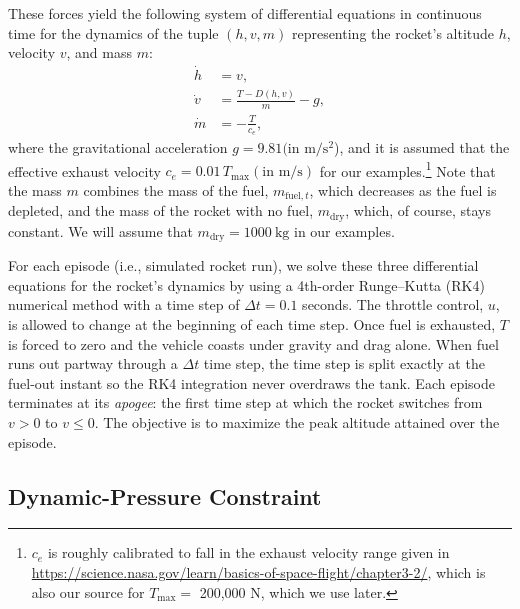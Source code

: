\documentclass[mnsc,sglanonrev]{informs4}
\begin{document}
These forces yield the following system of differential equations in continuous time for the dynamics of the tuple $(h,v,m)$ representing the rocket's altitude $h$, velocity $v$, and mass $m$:
\begin{align}
  \dot h &= v, \label{eq:hdot}\\
  \dot v &= \frac{T - D(h,v)}{m} - g, \label{eq:vdot}\\
  \dot m &= -\frac{T}{c_e}, \label{eq:mdot}
\end{align}
where the gravitational acceleration $g = 9.81 (\mbox{in } \mathrm{m/s^2}$), and it is assumed that the effective exhaust velocity $c_e = 0.01\, T_{\max} (\mbox{in } \mathrm{m/s})$ for our examples.\footnote{$c_e$ is roughly calibrated to fall in the exhaust velocity range given in \url{https://science.nasa.gov/learn/basics-of-space-flight/chapter3-2/}, which is also our source for  $T_\mathrm{max} =$ 200,000 N, which we use later.} Note that the mass $m$ combines the mass of the fuel, $m_{\textrm{fuel},t}$, which decreases as the fuel is depleted, and the mass of the rocket with no fuel, $m_{\mathrm{dry}}$, which, of course, stays constant. We will assume that $m_{\mathrm{dry}} = 1000\ \mathrm{kg}$ in our examples.

For each episode (i.e., simulated rocket run), we solve these three differential equations for the rocket's dynamics by using a 4th-order Runge--Kutta (RK4) numerical method with a time step of $\Delta t = 0.1$ seconds. The throttle control, $u$, is allowed to change at the beginning of each time step. Once fuel is exhausted, $T$ is forced to zero and the vehicle coasts under gravity and drag alone. When fuel runs out partway through a $\Delta t$ time step, the time step is split exactly at the fuel-out instant so the RK4 integration never overdraws the tank. 
Each episode terminates at its \emph{apogee}: the first time step at which the rocket switches from $v>0$ to $v\le 0$. The objective is to maximize the peak altitude attained over the episode.


\subsection{Dynamic-Pressure Constraint}
\label{sec:qmax}
\end{document}
